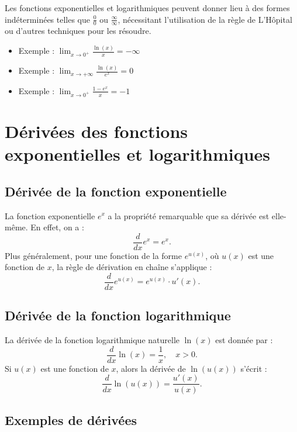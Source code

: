 \documentclass{article}
\begin{document}
	Les fonctions exponentielles et logarithmiques peuvent donner lieu à des formes indéterminées telles que \( \frac{0}{0} \) ou \( \frac{\infty}{\infty} \), nécessitant l'utilisation de la règle de L'Hôpital ou d'autres techniques pour les résoudre.
	
\begin{itemize}
	\item Exemple : \(\displaystyle \lim_{x \to 0^+} \frac{\ln(x)}{x} = -\infty \)
	
	\item Exemple : \(\displaystyle \lim_{x \to +\infty} \frac{\ln(x)}{e^x} = 0 \)
	
	\item Exemple : \(\displaystyle \lim_{x \to 0^+} \frac{1 - e^x}{x} = -1 \)
\end{itemize}

	\section{Dérivées des fonctions exponentielles et logarithmiques}
	
	\subsection{Dérivée de la fonction exponentielle}
	
	La fonction exponentielle \( e^x \) a la propriété remarquable que sa dérivée est elle-même. En effet, on a :
	\[
	\frac{d}{dx} e^x = e^x.
	\]
	Plus généralement, pour une fonction de la forme \( e^{u(x)} \), où \( u(x) \) est une fonction de \( x \), la règle de dérivation en chaîne s'applique :
	\[
	\frac{d}{dx} e^{u(x)} = e^{u(x)} \cdot u'(x).
	\]
	
	\subsection{Dérivée de la fonction logarithmique}
	
	La dérivée de la fonction logarithmique naturelle \( \ln(x) \) est donnée par :
	\[
	\frac{d}{dx} \ln(x) = \frac{1}{x} , \quad x > 0.
	\]
	Si \( u(x) \) est une fonction de \( x \), alors la dérivée de \( \ln(u(x)) \) s'écrit :
	\[
	\frac{d}{dx} \ln(u(x)) = \frac{u'(x)}{u(x)}.
	\]
	
	\subsection{Exemples de dérivées}
	
\end{document}
